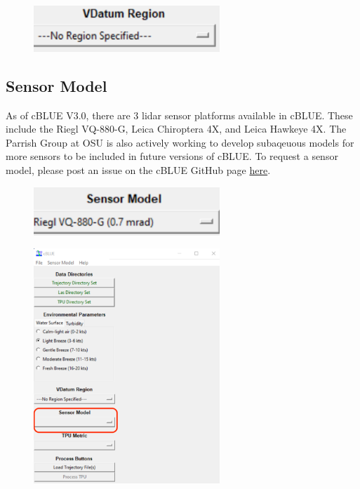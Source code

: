 \documentclass[11pt, a4paper]{article}
\begin{document}
\begin{figure}[H]
    \centering
    \includegraphics[width=7cm]{figs/vdat.png}
\end{figure}

\subsection{Sensor Model}
As of cBLUE V3.0, there are 3 lidar sensor platforms available in cBLUE. These include the Riegl VQ-880-G, Leica Chiroptera 4X, and Leica Hawkeye 4X. The Parrish Group at OSU is also actively working to develop subaqeuous models for more sensors to be included in future versions of cBLUE. To request a sensor model, please post an issue on the cBLUE GitHub page \href{https://github.com/parrishOSU/cBLUE.github.io/issues}{here}.

\begin{figure}[H]
    \centering
    \includegraphics[width=7cm]{figs/sensor.png}
\end{figure}

\begin{figure}[H]
    \centering
    \includegraphics[width=7cm]{figs/cblue_menu_sensor.png}
\end{figure}
\end{document}
